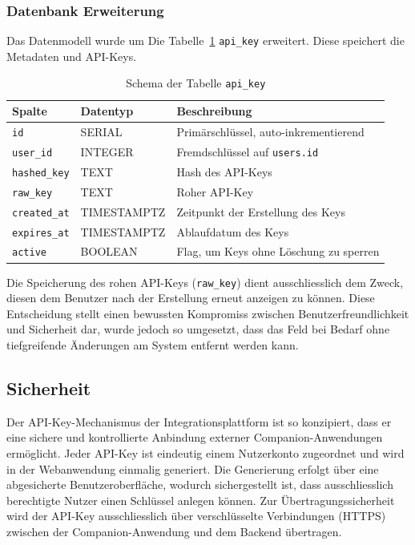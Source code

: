 \documentclass[12pt,a4paper]{report}
\begin{document}
\subsubsection{Datenbank Erweiterung}
Das Datenmodell wurde um Die Tabelle~\ref{tab:api_key_schema} \texttt{api\_key} erweitert. Diese speichert die Metadaten und
API-Keys.

\begin{table}[!htbp]
\centering
\begin{tabular}{|l|l|p{9cm}|}
\hline
  \textbf{Spalte} & \textbf{Datentyp} & \textbf{Beschreibung} \\
\hline
  \texttt{id} & SERIAL & Primärschlüssel, auto-inkrementierend \\
  \texttt{user\_id} & INTEGER & Fremdschlüssel auf \texttt{users.id} \\
  \texttt{hashed\_key} & TEXT &  Hash des API-Keys \\
  \texttt{raw\_key} & TEXT & Roher API-Key \\
  \texttt{created\_at} & TIMESTAMPTZ & Zeitpunkt der Erstellung des Keys \\
  \texttt{expires\_at} & TIMESTAMPTZ & Ablaufdatum des Keys \\
  \texttt{active} & BOOLEAN & Flag, um Keys ohne Löschung zu sperren \\
\hline
\end{tabular}
\caption{Schema der Tabelle \texttt{api\_key}}
\label{tab:api_key_schema}
\end{table}

Die Speicherung des rohen API-Keys (\texttt{raw\_key}) dient ausschliesslich dem Zweck, diesen dem Benutzer nach der Erstellung 
erneut anzeigen zu können. Diese Entscheidung stellt einen bewussten Kompromiss zwischen Benutzerfreundlichkeit und Sicherheit
dar, wurde jedoch so umgesetzt, dass das Feld bei Bedarf ohne tiefgreifende Änderungen am System entfernt werden kann.

\subsection{Sicherheit}

Der API-Key-Mechanismus der Integrationsplattform ist so konzipiert, dass er eine sichere und kontrollierte Anbindung externer
Companion-Anwendungen ermöglicht. Jeder API-Key ist eindeutig einem Nutzerkonto zugeordnet und wird in der Webanwendung einmalig
generiert. Die Generierung erfolgt über eine abgesicherte Benutzeroberfläche, wodurch sichergestellt ist, dass ausschliesslich
berechtigte Nutzer einen Schlüssel anlegen können. Zur Übertragungssicherheit wird der API-Key ausschliesslich über verschlüsselte
Verbindungen (HTTPS) zwischen der Companion-Anwendung und dem Backend übertragen.
\end{document}
